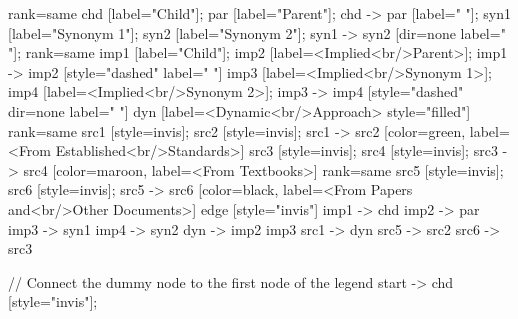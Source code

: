 \documentclass{article}
\begin{document}
{{    {
        rank=same
        chd [label="Child"];
        par [label="Parent"];
        chd -> par [label="                "];
        syn1 [label="Synonym 1"];
        syn2 [label="Synonym 2"];
        syn1 -> syn2 [dir=none label="                "];
    }
    {
        rank=same
        imp1 [label="Child"];
        imp2 [label=<Implied<br/>Parent>];
        imp1 -> imp2 [style="dashed" label="                "]
        imp3 [label=<Implied<br/>Synonym 1>];
        imp4 [label=<Implied<br/>Synonym 2>];
        imp3 -> imp4 [style="dashed" dir=none label="                "]
    }
        dyn [label=<Dynamic<br/>Approach> style="filled"]
{
rank=same
src1 [style=invis];
src2 [style=invis];
src1 -> src2 [color=green, label=<From Established<br/>Standards>]
src3 [style=invis];
src4 [style=invis];
src3 -> src4 [color=maroon, label=<From Textbooks>]
}
{
rank=same
src5 [style=invis];
src6 [style=invis];
src5 -> src6 [color=black, label=<From Papers and<br/>Other Documents>]
}
edge [style="invis"]
imp1 -> chd
imp2 -> par
imp3 -> syn1
imp4 -> syn2
dyn -> { imp2 imp3 }
src1 -> dyn
src5 -> src2
src6 -> src3
}

// Connect the dummy node to the first node of the legend
start -> chd [style="invis"];
}
\end{document}
